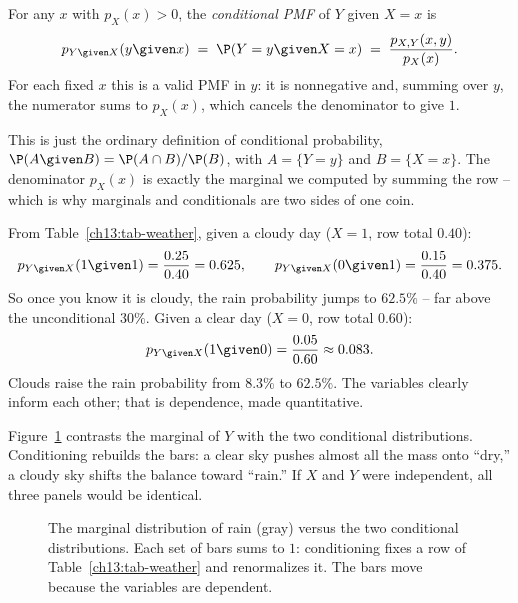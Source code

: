 \begin{definition}
\label{ch13:def-cond-pmf}
For any $x$ with $p_X(x) > 0$, the \emph{conditional PMF} of $Y$ given $X=x$ is
\[
  p_{Y\given X}(y \given x)
  \;=\; \P(Y=y \given X=x)
  \;=\; \frac{p_{X,Y}(x,y)}{p_X(x)}.
\]
For each fixed $x$ this is a valid PMF in $y$: it is nonnegative and, summing
over $y$, the numerator sums to $p_X(x)$, which cancels the denominator to give
$1$.
\end{definition}

This is just the ordinary definition of conditional probability,
$\P(A\given B)=\P(A\cap B)/\P(B)$, with $A=\{Y=y\}$ and $B=\{X=x\}$. The
denominator $p_X(x)$ is exactly the marginal we computed by summing the row --
which is why marginals and conditionals are two sides of one coin.

\begin{example}
\label{ch13:ex-rain-given-cloud}
From Table~\ref{ch13:tab-weather}, given a cloudy day ($X=1$, row total $0.40$):
\[
  p_{Y\given X}(1 \given 1) = \frac{0.25}{0.40} = 0.625,
  \qquad
  p_{Y\given X}(0 \given 1) = \frac{0.15}{0.40} = 0.375.
\]
So once you know it is cloudy, the rain probability jumps to $62.5\%$ -- far
above the unconditional $30\%$. Given a clear day ($X=0$, row total $0.60$):
\[
  p_{Y\given X}(1 \given 0) = \frac{0.05}{0.60} \approx 0.083 .
\]
Clouds raise the rain probability from $8.3\%$ to $62.5\%$. The variables clearly
inform each other; that is dependence, made quantitative.
\end{example}

Figure~\ref{ch13:fig-condbars} contrasts the marginal of $Y$ with the two
conditional distributions. Conditioning rebuilds the bars: a clear sky pushes
almost all the mass onto ``dry,'' a cloudy sky shifts the balance toward ``rain.''
If $X$ and $Y$ were independent, all three panels would be identical.

\begin{figure}[H]
\centering
{}
\caption{The marginal distribution of rain (gray) versus the two conditional
distributions. Each set of bars sums to $1$: conditioning fixes a row of
Table~\ref{ch13:tab-weather} and renormalizes it. The bars move because the
variables are dependent.}
\label{ch13:fig-condbars}
\end{figure}

